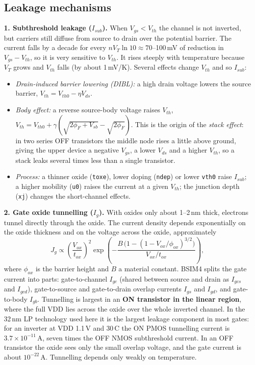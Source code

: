 \documentclass[10pt]{article}
\begin{document}
\subsection*{Leakage mechanisms}

\textbf{1. Subthreshold leakage ($I_{sub}$).} When $V_{gs} < V_{th}$ the channel is not inverted,
but carriers still diffuse from source to drain over the potential barrier. The current falls by a
decade for every $nV_T \ln 10 \approx 70$--100\,mV of reduction in $V_{gs} - V_{th}$, so it is very
sensitive to $V_{th}$. It rises steeply with temperature because $V_T$ grows and $V_{th}$ falls
(by about 1\,mV/K). Several effects change $V_{th}$ and so $I_{sub}$:
\begin{itemize}
\item \emph{Drain-induced barrier lowering (DIBL):} a high drain voltage lowers the source barrier,
$V_{th} = V_{th0} - \eta V_{ds}$.
\item \emph{Body effect:} a reverse source-body voltage raises $V_{th}$,
$V_{th} = V_{th0} + \gamma\left(\sqrt{2\phi_F + V_{sb}} - \sqrt{2\phi_F}\right)$. This is the origin
of the \emph{stack effect}: in two series OFF transistors the middle node rises a little above
ground, giving the upper device a negative $V_{gs}$, a lower $V_{ds}$ and a higher $V_{th}$, so a
stack leaks several times less than a single transistor.
\item \emph{Process:} a thinner oxide (\texttt{toxe}), lower doping (\texttt{ndep}) or lower
\texttt{vth0} raise $I_{sub}$; a higher mobility (\texttt{u0}) raises the current at a given
$V_{th}$; the junction depth (\texttt{xj}) changes the short-channel effects.
\end{itemize}

\textbf{2. Gate oxide tunnelling ($I_g$).} With oxides only about 1--2\,nm thick, electrons tunnel
directly through the oxide. The current density depends exponentially on the oxide thickness and on
the voltage across the oxide, approximately
\[
J_g \propto \left(\frac{V_{ox}}{t_{ox}}\right)^2 \exp\!\left(-\frac{B\,\big(1 - (1 - V_{ox}/\phi_{ox})^{3/2}\big)}{V_{ox}/t_{ox}}\right),
\]
where $\phi_{ox}$ is the barrier height and $B$ a material constant. BSIM4 splits the gate current
into parts: gate-to-channel $I_{gc}$ (shared between source and drain as $I_{gcs}$ and $I_{gcd}$),
gate-to-source and gate-to-drain overlap currents $I_{gs}$ and $I_{gd}$, and gate-to-body $I_{gb}$.
Tunnelling is largest in an \textbf{ON transistor in the linear region}, where the full VDD lies
across the oxide over the whole inverted channel. In the 32\,nm LP technology used here it is the
largest leakage component in most gates: for an inverter at VDD 1.1\,V and 30\,\textdegree C the ON
PMOS tunnelling current is $3.7 \times 10^{-11}$\,A, seven times the OFF NMOS subthreshold current.
In an OFF transistor the oxide sees only the small overlap voltage, and the gate current is about
$10^{-22}$\,A. Tunnelling depends only weakly on temperature.
\end{document}
